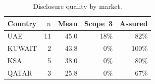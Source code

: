 \begin{table}[t]\centering
\caption{Disclosure quality by market.}\label{tab:country}
\begin{tabular}{lrrrr}\toprule
Country & $n$ & Mean \dqs{} & Scope~3 & Assured \\ \midrule
UAE & 11 & 45.0 & 18\% & 82\% \\
KUWAIT & 2 & 43.8 & 0\% & 100\% \\
KSA & 5 & 38.0 & 0\% & 80\% \\
QATAR & 3 & 25.8 & 0\% & 67\% \\
\bottomrule\end{tabular}\end{table}

